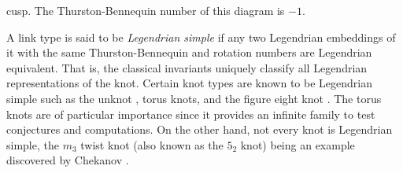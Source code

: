 \documentclass{article}
\theoremstyle{plain}
\begin{document}
        cusp. The Thurston-Bennequin number of this diagram is $-1$.
        \par\hfill\par
        A link type is said to be \textit{Legendrian simple} if
        any two Legendrian embeddings of it with the same Thurston-Bennequin
        and rotation numbers are Legendrian equivalent. That is, the classical
        invariants uniquely classify all Legendrian representations of the knot.
        Certain knot types are known to be Legendrian simple such as the unknot
        \cite{EliashbergFraserClassificationTopTrivialLegKnots}, torus knots,
        and the figure eight knot \cite{EtnyreHondaContactTopologyI}. The torus
        knots are of particular importance since it provides an infinite
        family to test conjectures and computations. On the other hand,
        not every knot is Legendrian simple, the $m_{3}$ twist knot (also
        known as the $5_{2}$ knot) being an example discovered by Chekanov
        \cite{ChekanovDifAlgOfLegLinks}.
\end{document}
